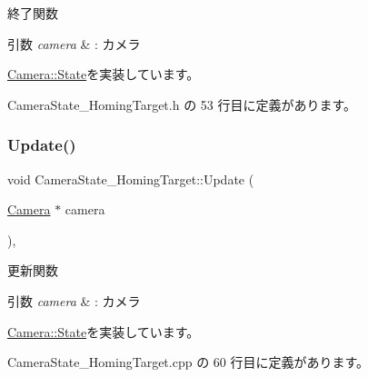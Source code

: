 終了関数 


\begin{DoxyParams}{引数}
{\em camera} & \+: カメラ \\
\hline
\end{DoxyParams}


\mbox{\hyperlink{class_camera_1_1_state_adb3f43b6c3f8100da7877867180e804b}{Camera\+::\+State}}を実装しています。



 Camera\+State\+\_\+\+Homing\+Target.\+h の 53 行目に定義があります。

\mbox{\label{class_camera_state___homing_target_a98f04985c06033febdad32d6357088c9}} 
\subsubsection{\texorpdfstring{Update()}{Update()}}
{\footnotesize\ttfamily void Camera\+State\+\_\+\+Homing\+Target\+::\+Update (\begin{DoxyParamCaption}\item[{\mbox{\hyperlink{class_camera}{Camera}} $\ast$}]{camera }\end{DoxyParamCaption})\hspace{0.3cm}{\ttfamily [override]}, {\ttfamily [virtual]}}



更新関数 


\begin{DoxyParams}{引数}
{\em camera} & \+: カメラ \\
\hline
\end{DoxyParams}


\mbox{\hyperlink{class_camera_1_1_state_a2d41e0cb783666bae6c6ea167fcc7874}{Camera\+::\+State}}を実装しています。



 Camera\+State\+\_\+\+Homing\+Target.\+cpp の 60 行目に定義があります。

